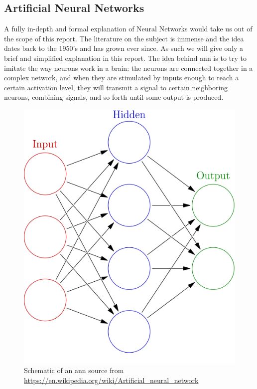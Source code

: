 \subsection{Artificial Neural Networks}
A fully in-depth and formal explanation of Neural Networks would take us out of the scope of this report. The literature on the subject is immense and the idea dates back to the 1950's and has grown ever since. As such we will give only a brief and simplified explanation in this report.
The idea behind \acrfull{ann} is to try to imitate the way neurons work in a brain: the neurons are connected together in a complex network, and when they are stimulated by inputs enough to reach a certain activation level, they will transmit a signal to certain neighboring neurons, combining signals, and so forth until some output is produced.

\begin{figure}
	\centering
	\includegraphics[width=\textwidth]{img/Colored_neural_network.png}
	\caption{Schematic of an \acrlong{ann} source from \url{https://en.wikipedia.org/wiki/Artificial_neural_network}}
	\label{fig:nn}
\end{figure}

